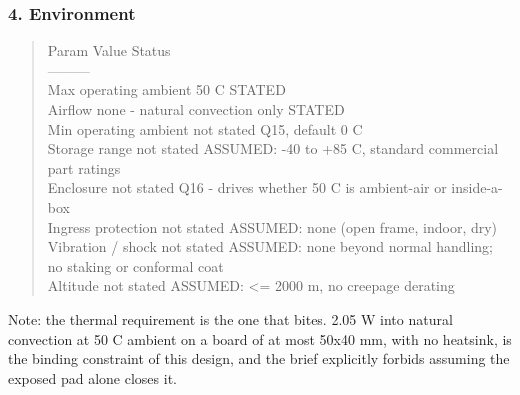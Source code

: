 \documentclass[11pt,a4paper]{article}
\begin{document}
\subsubsection*{4. Environment}
\begin{quote}\small\ttfamily\raggedright
\textbar{} Param \textbar{} Value \textbar{} Status \textbar{}\\
\textbar{}---\textbar{}---\textbar{}---\textbar{}\\
\textbar{} Max operating ambient \textbar{} 50 C \textbar{} STATED \textbar{}\\
\textbar{} Airflow \textbar{} none - natural convection only \textbar{} STATED \textbar{}\\
\textbar{} Min operating ambient \textbar{} not stated \textbar{} Q15, default 0 C \textbar{}\\
\textbar{} Storage range \textbar{} not stated \textbar{} ASSUMED: -40 to +85 C, standard commercial part ratings \textbar{}\\
\textbar{} Enclosure \textbar{} not stated \textbar{} Q16 - drives whether 50 C is ambient-air or inside-a-box \textbar{}\\
\textbar{} Ingress protection \textbar{} not stated \textbar{} ASSUMED: none (open frame, indoor, dry) \textbar{}\\
\textbar{} Vibration / shock \textbar{} not stated \textbar{} ASSUMED: none beyond normal handling; no staking or conformal coat \textbar{}\\
\textbar{} Altitude \textbar{} not stated \textbar{} ASSUMED: \textless{}= 2000 m, no creepage derating \textbar{}
\end{quote}
Note: the thermal requirement is the one that bites. 2.05 W into natural convection at 50 C ambient on a board of at most 50x40 mm, with no heatsink, is the binding constraint of this design, and the brief explicitly forbids assuming the exposed pad alone closes it.
\end{document}

